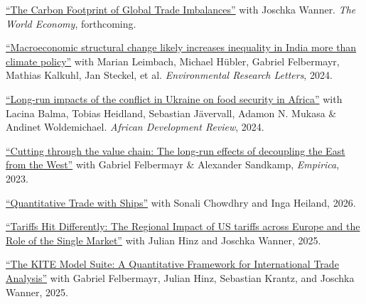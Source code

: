 \documentclass{article}
\newlength{\cvlabelwidth}\setlength{\cvlabelwidth}{0.12\textwidth}
\newlength{\cvlabelgap}\setlength{\cvlabelgap}{5mm}
\newcommand{\cvmakelabel}[1]{%
    \smash{\parbox[t]{\cvlabelwidth}{\raggedright{\fontfamily{phv}\selectfont #1}}}}
\newenvironment{cvsection}[1]{%
    \par\medskip
    \begin{list}{}{%
        \setlength{\leftmargin}{\dimexpr\cvlabelwidth+\cvlabelgap\relax}%
        \setlength{\labelwidth}{\cvlabelwidth}%
        \setlength{\labelsep}{\cvlabelgap}%
        \setlength{\rightmargin}{0pt}%
        \setlength{\itemindent}{0pt}%
        \setlength{\listparindent}{0pt}%
        \setlength{\topsep}{0pt}%
        \setlength{\partopsep}{0pt}%
        \setlength{\parsep}{0.3em}%
        \setlength{\itemsep}{0pt}%
        \let\makelabel\cvmakelabel%
    }%
    \item[#1]\ignorespaces%
}{%
    \end{list}\medskip%
}
\begin{document}
\begin{cvsection}{PUBLICATIONS}
    \href{https://www.cesifo.org/en/publications/2023/working-paper/carbon-footprint-global-trade-imbalances}{``The Carbon Footprint of Global Trade Imbalances''} with Joschka Wanner. \textit{The World Economy}, forthcoming. \par
    \href{https://www.doi.org/10.1088/1748-9326/ad34e9}{``Macroeconomic structural change likely increases inequality in India more than climate policy''} with Marian Leimbach, Michael Hübler, Gabriel Felbermayr, Mathias Kalkuhl, Jan Steckel, et al. \textit{Environmental Research Letters}, 2024. \par
    \href{http://doi.org/10.1111/1467-8268.12745}{``Long-run impacts of the conflict in Ukraine on food security in Africa''} with Lacina Balma, Tobias Heidland, Sebastian Jävervall, Adamon N. Mukasa \& Andinet Woldemichael. \textit{African Development Review}, 2024. \par
    \href{https://doi.org/10.1007/s10663-022-09561-w}{``Cutting through the value chain: The long-run effects of decoupling the East from the West''} with Gabriel Felbermayr \& Alexander Sandkamp, \textit{Empirica}, 2023. \par
\end{cvsection}


\begin{cvsection}{WORKING PAPER}
    \href{https://www.kielinstitut.de/de/publikationen/quantitative-trade-with-ships-19579/}{``Quantitative Trade with Ships''} with Sonali Chowdhry and Inga Heiland, 2026. \par
    \href{https://www.kielinstitut.de/de/publikationen/tariffs-hit-differently-the-regional-impact-of-us-tariffs-across-europe-and-the-role-of-the-single-market-19225/}{``Tariffs Hit Differently: The Regional Impact of US tariffs across Europe and the Role of the Single Market''} with Julian Hinz and Joschka Wanner, 2025. \par
    \href{https://trade.ifw-kiel.de/KTTM/KITE_whitepaper.pdf}{``The KITE Model Suite: A Quantitative Framework for
International Trade Analysis''} with Gabriel Felbermayr, Julian Hinz, Sebastian Krantz, and Joschka Wanner, 2025. \par
\end{cvsection}

\end{document}
